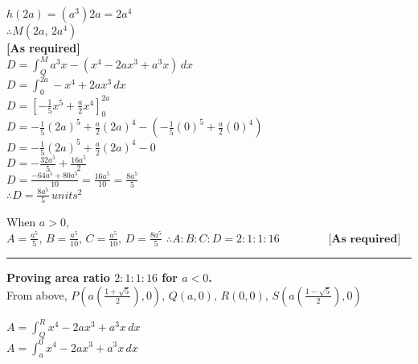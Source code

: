 \documentclass{homework}
\begin{document}
\begin{flushleft}
\begin{paracol}{2}
$h(2a)=(a^3)2a=2a^4$ \vspace{0.5em}\\
$\therefore M(2a, \,2a^4)$ \vspace{0.5em}\\
\hspace{13em} \textbf{[As required]} \\
\vspace{2em}
$D=\int_Q^M a^3x-(x^4-2ax^3+a^3x)\, dx $ \vspace{0.5em} \\ 
$D=\int_0^{2a} -x^4+2ax^3\, dx $ \vspace{0.5em} \\ 
$D=[-\frac{1}{5}x^5+\frac{a}{2}x^4]_0^{2a}$ \vspace{0.5em} \\
$D=-\frac{1}{5}(2a)^5+\frac{a}{2}(2a)^4-(-\frac{1}{5}(0)^5+\frac{a}{2}(0)^4)$ \vspace{0.5em} \\
$D=-\frac{1}{5}(2a)^5+\frac{a}{2}(2a)^4-0$ \vspace{0.5em} \\
$D=-\frac{32a^5}{5}+\frac{16a^5}{2}$ \vspace{0.5em} \\
$D=\frac{-64a^5+80a^5}{10}=\frac{16a^5}{10}=\frac{8a^5}{5}$ \vspace{0.5em} \\
$\therefore D=\frac{8a^5}{5} \, units^2$
\end{paracol}
When $a>0$, \vspace{0.5em}\\
$A=\frac{a^5}{5},\, B=\frac{a^5}{10},\, C=\frac{a^5}{10},\, D=\frac{8a^5}{5}$ \hspace{4em} $\therefore A:B:C:D=2:1:1:16 $ 
$\hspace{4em}\textbf{[As required]}$
\\
\rule{45em}{0.2pt} $  $ \vspace{2em} \\
    \textbf{Proving area ratio $2:1:1:16$ for $a<0$.} \vspace{0.7em}\\
    From above, $P(a(\frac{1+\sqrt{5}}{2}),0), \, Q(a,0), \, R(0,0), \, S(a(\frac{1-\sqrt{5}}{2}),0)$\vspace{0.5em} \\
\begin{paracol}{2}
    $A=\int_Q^Rx^4-2ax^3+a^3x\, dx$ \vspace{0.5em}\\
    $A=\int_a^0x^4-2ax^3+a^3x\, dx$ \vspace{0.5em}\\

\end{paracol}
\end{flushleft}
\end{document}
